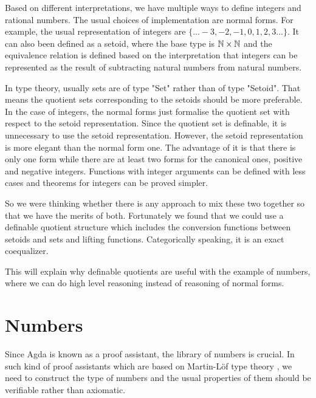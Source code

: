 \documentclass{article}
\begin{document}
Based on different interpretations, we have multiple ways to define integers and rational numbers. The usual choices of implementation are normal forms. 
For example, the usual representation of integers are $\{ ... -3, -2, -1 , 0 ,1 ,2, 3 ... \}$. It can also been defined as a setoid, where the base type is
$\mathbb{N}\times\mathbb{N}$ and the equivalence relation is defined based on the interpretation that integers can be represented as 
the result of subtracting natural numbers from natural numbers.

In type theory, usually sets are of type "Set" rather than of type "Setoid". That means the quotient sets corresponding to the setoids should be more
preferable. In the case of integers, the normal forms just formalise the quotient set with respect to the setoid representation. Since the quotient set is definable,
it is unnecessary to use the setoid representation. However, the setoid representation is more elegant than the normal form one. The advantage of it is that there is only one form while there are at least
two forms for the canonical ones, positive and negative integers. Functions with integer arguments can be defined with less cases and theorems for integers can
 be proved simpler.

So we were thinking whether there is any approach to mix these two together so that we have the merits of both. Fortunately we found that we could use a definable quotient structure \cite{aan} which
includes the conversion functions between setoids and sets and lifting functions. Categorically speaking, it is an exact coequalizer.

This will explain why definable quotients are useful with the example of numbers, where we can do high level reasoning instead of reasoning of normal forms.








\section{Numbers} 


Since Agda is known as a proof assistant, the library of numbers is
crucial. In such kind of proof assistants which are based on
Martin-L\"{o}f type theory , we need to construct the type of numbers and
the usual properties of them should be verifiable rather than
axiomatic.
\end{document}
